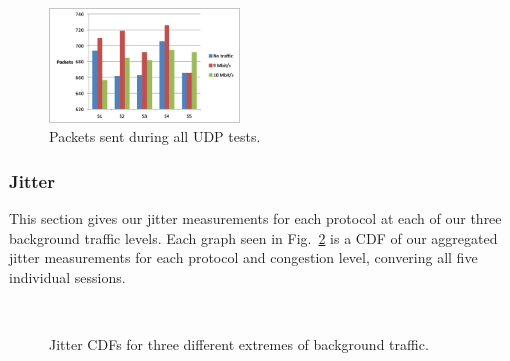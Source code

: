\begin{figure}[!h]
   \centering
      \includegraphics[width=0.45\textwidth]{pics/udp_sent}
   \caption{Packets sent during all UDP tests.}
\label{fig:udp_sent}
\end{figure}

\subsubsection{Jitter}

This section gives our jitter measurements for each protocol at each of our
three background traffic levels. Each graph seen in Fig.~\ref{fig:jitter_graphs} is a CDF of our aggregated jitter
measurements for each protocol and congestion level, convering all five
individual sessions.

\begin{figure}[!t]
   \centering
  \\ 
   \caption{Jitter CDFs for three different extremes of background traffic.}
\label{fig:jitter_graphs}
\end{figure}

